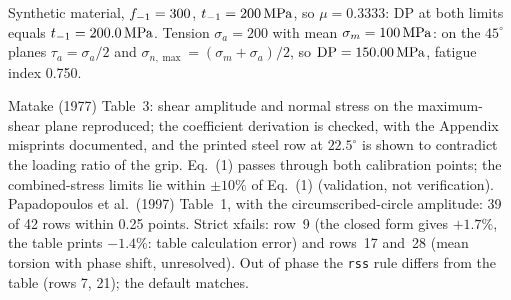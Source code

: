  Synthetic material, $f_{-1}=300$, $t_{-1}=200\,\mathrm{MPa}$, so $\mu=0.3333$: DP at both
limits equals $t_{-1}=200.0\,\mathrm{MPa}$. Tension $\sigma_a=200$ with mean $\sigma_m=100\,\mathrm{MPa}$: on the $45^\circ$
planes $\tau_a=\sigma_a/2$ and $\sigma_{n,\max}=(\sigma_m+\sigma_a)/2$, so $\mathrm{DP}=150.00\,\mathrm{MPa}$,
fatigue index 0.750.

 Matake (1977) Table~3: shear amplitude and normal stress on the maximum-shear
plane reproduced; the coefficient derivation is checked, with the Appendix misprints documented, and
the printed steel row at $22.5^\circ$ is shown to contradict the loading ratio of the grip. Eq.~(1)
passes through both calibration points; the combined-stress limits lie within $\pm10\%$ of Eq.~(1)
(validation, not verification). Papadopoulos et al.\ (1997) Table~1, with the circumscribed-circle
amplitude: 39 of 42 rows within 0.25 points. Strict xfails: row~9 (the closed form gives $+1.7\%$,
the table prints $-1.4\%$: table calculation error) and rows~17 and~28 (mean torsion with phase
shift, unresolved). Out of phase the \texttt{rss} rule differs from the table (rows 7, 21); the default matches.
